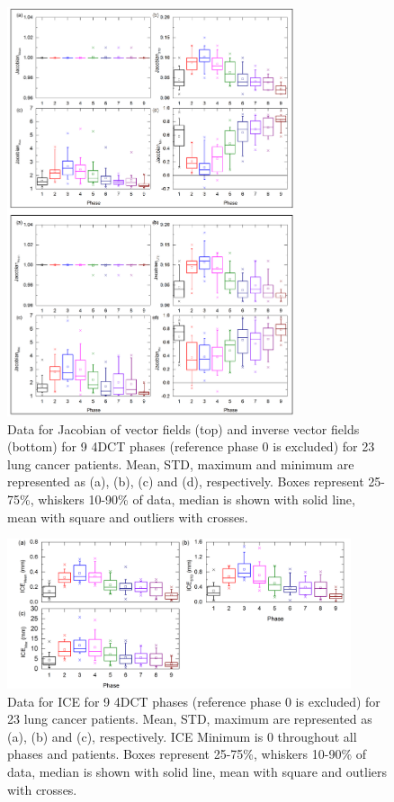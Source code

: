 \documentclass[type=dr, dr=rernat, accentcolor=tud7b,colorbacktitle, bigchapter, openright, twoside, 12pt ]{tudthesis}
\begin{document}
\begin{figure}[H]
	\begin{center}		
		\includegraphics[width=0.75\textwidth]{./Images/Jacobian_data_pigs.png}
		\caption{Data for Jacobian of vector fields (top) and inverse vector fields (bottom) for 9 4DCT phases (reference phase 0 is excluded) for 23 lung cancer patients. Mean, STD, maximum and minimum are represented as (a), (b), (c) and (d), respectively.
		Boxes represent 25-75\%, whiskers 10-90\% of data, median is shown with solid line, mean with square and outliers with crosses.}
		\label{jacobian_data_pigs}
	\end{center}
\end{figure}

\newpage

\begin{figure}[H]
	\begin{center}		
		\includegraphics[width=0.9\textwidth]{./Images/ICE_pigs.png}
		\caption{Data for ICE for 9 4DCT phases (reference phase 0 is excluded) for 23 lung cancer patients. Mean, STD, maximum are represented as (a), (b) and (c), respectively. ICE Minimum is 0 throughout all phases and patients.
		Boxes represent 25-75\%, whiskers 10-90\% of data, median is shown with solid line, mean with square and outliers with crosses.}
		\label{ice_pigs}
	\end{center}
\end{figure}
\end{document}
